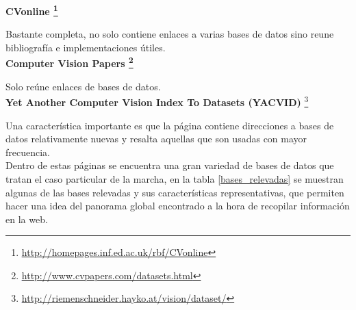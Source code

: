 \hspace{-0.7cm} \textbf{CVonline \footnote{\textcolor{blue}{\underline{\url{http://homepages.inf.ed.ac.uk/rbf/CVonline}}}} } 

Bastante completa, no solo contiene enlaces a  varias bases de datos sino reune bibliografía e implementaciones útiles.\\


\hspace{-0.7cm} \textbf{Computer Vision Papers \footnote{\textcolor{blue}{\underline{\url{ http://www.cvpapers.com/datasets.html}}}} } 

	 Solo reúne enlaces de bases de datos.\\
		

\hspace{-0.7cm} \textbf{Yet Another Computer Vision Index To Datasets (YACVID)} \footnote{\textcolor{blue}{\underline{\url{http://riemenschneider.hayko.at/vision/dataset/}}} } 	

Una característica importante es que la página contiene direcciones a bases de datos relativamente nuevas y resalta aquellas que son usadas con mayor frecuencia. \\
	

Dentro de estas páginas se encuentra una gran variedad de bases de datos que tratan el caso particular de la marcha, en la tabla \ref{bases_relevadas} se muestran algunas de las bases relevadas y sus características representativas, que permiten hacer una idea del panorama global encontrado a la hora de recopilar información en la web.  

